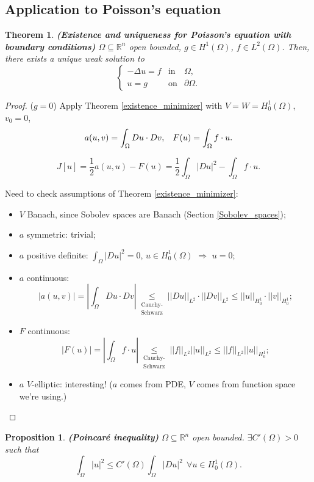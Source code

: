 \documentclass[12pt]{article}
\newtheorem{proposition}{Proposition}[section]
\newtheorem{theorem}{Theorem}[section]
\theoremstyle{definition}
\begin{document}
\subsection{Application to Poisson's equation}
\begin{theorem}\label{Poisson_Sobolev}
\emph{\textbf{(Existence and uniqueness for Poisson's equation with boundary conditions)}} $\Omega\subseteq\mathbb{R}^n$ open bounded, $g\in H^1(\Omega)$, $f\in L^2(\Omega)$. Then, there exists a unique weak solution to
\[\left\{\begin{array}{rcl}-\Delta u=f&\text{in}&\Omega,\\u=g&\text{on}&\partial\Omega.\end{array}\right.\]
\end{theorem}

\begin{proof}
($g=0$) Apply Theorem \ref{existence_minimizer} with $V=W=H_0^1(\Omega)$, $v_0=0$,
\[a(u,v)=\int_{\Omega}Du\cdot Dv,\hspace{3mm}F(u)=\int_{\Omega}f\cdot u.\]

\[J[u]=\frac{1}{2}a(u,u)-F(u)=\frac{1}{2}\int_{\Omega}|Du|^2-\int_{\Omega}f\cdot u.\]

Need to check assumptions of Theorem \ref{existence_minimizer}:
\begin{itemize}
\item $V$ Banach, since Sobolev spaces are Banach (Section \ref{Sobolev_spaces});
\item $a$ symmetric: trivial;
\item $a$ positive definite: $\int_{\Omega}|Du|^2=0$, $u\in H_0^1(\Omega)$ $\Rightarrow$ $u=0$;
\item $a$ continuous:
\[\big|a(u,v)\big|=\left|\int_{\Omega}Du\cdot Dv\right|\underset{\substack{\text{Cauchy-}\\\text{Schwarz}}}{\leq}||Du||_{L^2}\cdot||Dv||_{L^2}\leq||u||_{H_0^1}\cdot||v||_{H_0^1};\]
\item $F$ continuous:
\[|F(u)|=\left|\int_{\Omega}f\cdot u\right|\underset{\substack{\text{Cauchy-}\\\text{Schwarz}}}{\leq}||f||_{L^2}||u||_{L^2}\leq||f||_{L^2}||u||_{H_0^1};\]
\item $a$ $V$-elliptic: interesting! ($a$ comes from PDE, $V$ comes from function space we're using.)
\end{itemize}
\end{proof}

\begin{proposition}
\emph{\textbf{(Poincar\'{e} inequality)}} $\Omega\subseteq\mathbb{R}^n$ open bounded. $\exists C'(\Omega)>0$ such that
\[\int_{\Omega}|u|^2\leq C'(\Omega)\int_{\Omega}|Du|^2\ \ \forall u\in H_0^1(\Omega).\]
\end{proposition}
\end{document}
